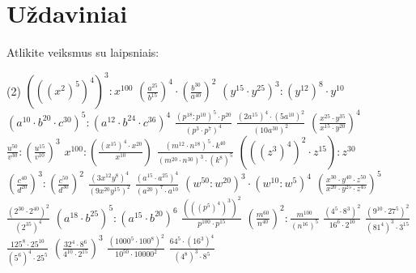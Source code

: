 \documentclass[11pt,a4paper]{scrartcl}
\begin{document}
\section{Uždaviniai}
\begin{problem}
Atlikite veiksmus su laipsniais:

\begin{tasks}[label={(\arabic*)},label-offset=0.9em](2)
    \task $(((x^2)^5)^4)^3 : x^{100}$
    \task $\left(\frac{a^{25}}{b^{15}}\right)^4 \cdot \left(\frac{b^{30}}{a^{40}}\right)^2$
    \task $(y^{15} \cdot y^{25})^3 : (y^{12})^8 \cdot y^{10}$
    \task $(a^{10} \cdot b^{20} \cdot c^{30})^5 : (a^{12} \cdot b^{24} \cdot c^{36})^4$
    \task $\frac{(p^{18} : p^{10})^5 \cdot p^{20}}{(p^3 \cdot p^7)^4}$
    \task $\frac{(2a^{15})^4 \cdot (5a^{10})^2}{(10a^{30})^2}$
    \task $\left( \frac{x^{25} \cdot y^{35}}{x^{15} \cdot y^{20}} \right)^4$
    \task $\frac{u^{50}}{v^{30}} : \left(\frac{u^{15}}{v^{10}}\right)^3$
    \task $x^{100} : \left( \frac{(x^{15})^4 \cdot x^{20}}{x^{10}} \right)$
    \task $\frac{(m^{12} \cdot n^{18})^5 \cdot k^{40}}{(m^{20} \cdot n^{30})^3 \cdot (k^8)^5}$
    \task $(((z^3)^4)^2 \cdot z^{15}) : z^{30}$
    \task $\left(\frac{c^{40}}{d^{20}}\right)^3 : \left(\frac{c^{50}}{d^{30}}\right)^2$
    \task $\frac{(3x^{12}y^8)^4}{(9x^{20}y^{15})^2}$
    \task $\frac{(a^{15} \cdot a^{25})^4}{(a^{20})^7 \cdot a^{10}}$
    \task $(w^{50} : w^{20})^3 \cdot (w^{10} : w^5)^4$
    \task $\left( \frac{x^{30} \cdot y^{40} \cdot z^{50}}{x^{20} \cdot y^{25} \cdot z^{45}} \right)^5$
    \task $\frac{(2^{30} \cdot 2^{40})^2}{(2^{35})^4}$
    \task $(a^{18} \cdot b^{25})^5 : (a^{15} \cdot b^{20})^6$
    \task $\frac{(((p^5)^4)^3)^2}{p^{100} \cdot p^{15}}$
    \task $\left(\frac{m^{60}}{n^{40}}\right)^2 : \frac{m^{100}}{(n^{16})^5}$
    \task $\frac{(4^5 \cdot 8^3)^2}{16^6 \cdot 2^{10}}$
    \task $\frac{(9^{10} \cdot 27^5)^2}{(81^4)^3 \cdot 3^{15}}$
    \task $\frac{125^8 \cdot 25^{10}}{(5^6)^4 \cdot 25^5}$
    \task $\left( \frac{32^4 \cdot 8^6}{4^{10} \cdot 2^{15}} \right)^3$
    \task $\frac{(1000^5 \cdot 100^8)^2}{10^{50} \cdot 10000^2}$
    \task $\frac{64^5 \cdot (16^3)^4}{(4^8)^3 \cdot 8^5}$
\end{tasks}
\end{problem}
\end{document}
